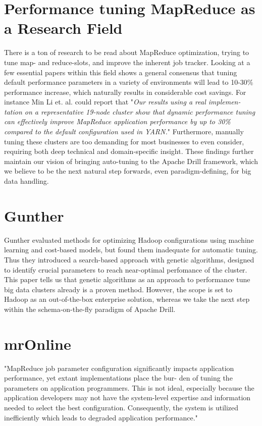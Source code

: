 \documentclass[a4paper,english]{report}
\begin{document}
		\section{Performance tuning MapReduce as a Research Field}
		There is a ton of research to be read about MapReduce optimization, trying to tune map- and reduce-slots, and improve the inherent job tracker. Looking at a few essential papers within this field shows a general consensus that tuning default performance parameters in a variety of environments will lead to 10-30\% performance increase, which naturally results in considerable cost savings. For instance Min Li et. al. could report that "\textit{Our results using a real implemen-
		tation on a representative 19-node cluster show that dynamic performance tuning can effectively improve MapReduce application performance by up to 30\% compared to the default configuration used in YARN.}"\cite{mronline} Furthermore, manually tuning these clusters are too demanding for most businesses to even consider, requiring both deep technical and domain-specific insight. These findings further maintain our vision of bringing auto-tuning to the Apache Drill framework, which we believe to be the next natural step forwards, even paradigm-defining, for big data handling.
		
		\section{Gunther}
		Gunther evaluated methods for optimizing Hadoop configurations using machine learning and cost-based models, but found them inadequate for automatic tuning. Thus they introduced a search-based approach with genetic algorithms, designed to identify crucial parameters to reach near-optimal perfomance of the cluster.\cite{gunther} This paper tells us that genetic algorithms as an approach to performance tune big data clusters already is a proven method. However, the scope is set to Hadoop as an out-of-the-box enterprise solution, whereas we take the next step within the schema-on-the-fly paradigm of Apache Drill.
		
		\section{mrOnline}
		"MapReduce job parameter configuration significantly impacts
		application performance, yet extant implementations place the bur-
		den of tuning the parameters on application programmers. This is
		not ideal, especially because the application developers may not
		have the system-level expertise and information needed to select
		the best configuration. Consequently, the system is utilized inefficiently which leads to degraded application performance."\cite{mronline}
		
\end{document}
